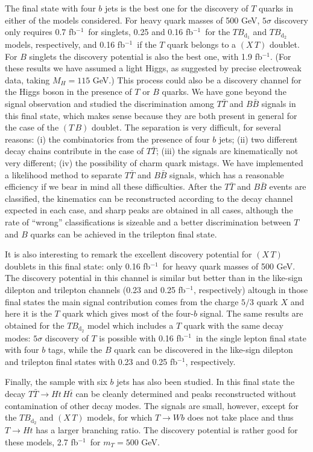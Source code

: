 \documentclass[12pt,a4paper]{article}
\newcommand{\fbin}{fb$^{-1}$}
\newcommand{\TT}{T \bar T}
\newcommand{\BB}{B \bar B}
\newcommand{\TBd}{TB_{\text{d}_1}}
\newcommand{\TBD}{TB_{\text{d}_2}}
\newcommand{\TB}{(T \, B)}
\newcommand{\XT}{(X \, T)}
\begin{document}
The final state with four $b$ jets is the best one for the discovery of $T$ quarks in either of the models considered. For heavy quark masses of 500 GeV, $5\sigma$ discovery
only requires 0.7 \fbin\ for singlets, 0.25 and 0.16 \fbin\ for the $\TBd$ and
$\TBD$ models, respectively, and 0.16 \fbin\ if the $T$ quark belongs to a $\XT$ doublet. For $B$ singlets the discovery potential is also the best one, with 1.9 \fbin.
 (For these results we have assumed a light Higgs, as suggested by precise electroweak data, taking $M_H = 115$ GeV.) This process could also be a discovery channel for the Higgs boson in the presence of $T$ or $B$ quarks. We have gone beyond the signal observation and studied the discrimination among $\TT$ and $\BB$ signals in this final state, which makes sense because they are both present in general for the case of the $\TB$ doublet. The separation is very difficult, for several reasons: (i) the combinatorics from the presence of four $b$ jets;
 (ii) two different decay chains contribute in the case of $\TT$; (iii) the signals are  kinematically not very different; (iv) the possibility of charm quark mistags. We have implemented a likelihood method to separate $\TT$ and $\BB$ signals, which has a reasonable efficiency if we bear in mind all these difficulties. After the $\TT$ and $\BB$ events are classified, the kinematics can be reconstructed according to the decay channel expected in each case, and sharp peaks are obtained in all cases, although the rate of ``wrong'' classifications is sizeable and a better discrimination between $T$ and $B$ quarks can be achieved in the trilepton final state. 
 
It is also interesting to remark the excellent discovery potential for $\XT$ doublets in this final state: only 0.16 \fbin\ for heavy quark masses of 500 GeV. The discovery potential in this channel is similar but better than in the like-sign dilepton and trilepton channels (0.23 and 0.25 \fbin, respectively) altough in those final states the main signal contribution comes from the charge $5/3$ quark $X$ and here it is the $T$ quark which gives most of the four-$b$ signal. The same results are obtained for the $\TBD$ model which includes a $T$ quark with the same decay modes: $5\sigma$ discovery of $T$ is possible with 0.16 \fbin\ in the single lepton final state with four $b$ tags, while the $B$ quark can be discovered in the like-sign dilepton and trilepton final states with 0.23 and 0.25 \fbin, respectively.

Finally, the sample with six $b$ jets has also been studied. In this final state the decay $\TT \to Ht \, H \bar t$ can be cleanly determined and peaks reconstructed without contamination of other decay modes. The signals are small, however, except for the $\TBD$ and $\XT$ models, for which $T \to Wb$ does not take place and thus
$T \to Ht$ has a larger branching ratio. The discovery potential is rather good for these models, 2.7 \fbin\ for $m_T = 500$ GeV.
 
\end{document}

